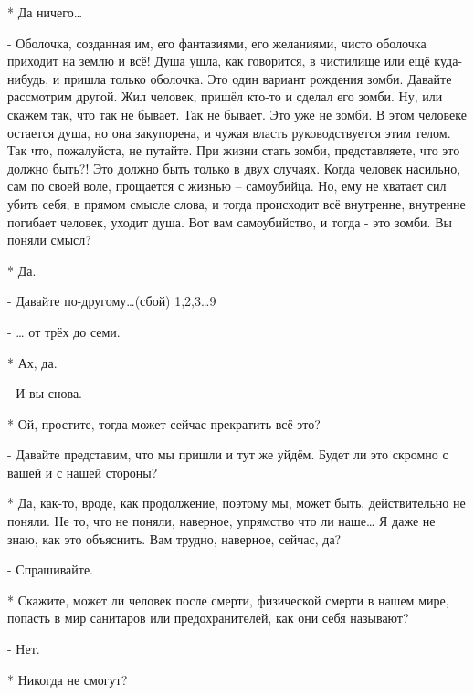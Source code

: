 * Да ничего…

- Оболочка, созданная им, его фантазиями, его желаниями, чисто оболочка приходит на землю и всё! Душа ушла, как говорится, в чистилище или ещё куда-нибудь, и пришла только оболочка. Это один вариант рождения зомби. Давайте рассмотрим другой. Жил человек, пришёл кто-то и сделал его зомби. Ну, или скажем так, что так не бывает. Так не бывает. Это уже не зомби. В этом человеке остается душа, но она закупорена, и чужая власть руководствуется этим телом. Так что, пожалуйста, не путайте. При жизни стать зомби,  представляете, что это должно быть?! Это должно быть только в двух случаях. Когда человек насильно, сам по своей воле, прощается с жизнью – самоубийца. Но, ему не хватает сил убить себя, в прямом смысле слова, и тогда происходит всё внутренне, внутренне погибает человек, уходит душа. Вот вам самоубийство, и тогда - это зомби. Вы поняли смысл?

* Да.

- Давайте по-другому…(сбой)
1,2,3…9

- … от трёх до семи.

* Ах, да.

- И вы снова.

* Ой, простите, тогда может сейчас прекратить всё это?

- Давайте представим, что мы пришли и тут же уйдём. Будет ли это скромно с вашей и с нашей стороны?

* Да, как-то, вроде, как продолжение, поэтому мы, может быть, действительно не поняли. Не то, что не поняли, наверное, упрямство что ли наше… Я даже не знаю, как это объяснить. Вам трудно, наверное, сейчас, да?

- Спрашивайте.

* Скажите, может ли человек после смерти, физической смерти в нашем мире, попасть в мир санитаров или предохранителей, как они себя называют?

- Нет.

* Никогда не смогут?

